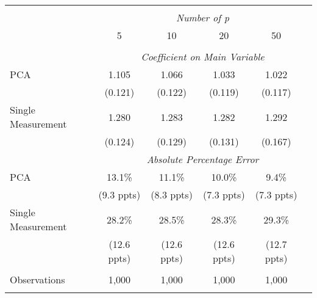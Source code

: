\begin{table}[!htbp] \centering
\begin{tabular}{@{\extracolsep{5pt}}lccccc}
\\[-1.8ex]\hline
\hline \\[-1.8ex]
& \multicolumn{5}{c}{\textit{Number of p}} \
\cr \cline{5-6}
\\[-1.8ex] & 5 & 10 & 20 & 50 \\
\hline \\[-1.8ex]
& \multicolumn{5}{c}{\textit{Coefficient on Main Variable}} \\
 PCA & 1.105 & 1.066 & 1.033 & 1.022  \\
  & (0.121) & (0.122) & (0.119) & (0.117)\\
  Single Measurement & 1.280 & 1.283 & 1.282 & 1.292  \\
  & (0.124) & (0.129) & (0.131) & (0.167)\\
& \multicolumn{5}{c}{\textit{Absolute Percentage Error}} \\
  PCA & 13.1\% & 11.1\% & 10.0\% & 9.4\%  \\
   & (9.3 ppts) & (8.3 ppts) & (7.3 ppts) & (7.3 ppts)\\
  Single Measurement & 28.2\% & 28.5\% & 28.3\% & 29.3\%  \\
  & (12.6 ppts) & (12.6 ppts) & (12.6 ppts) & (12.7 ppts)\\
\hline \\[-1.8ex]
 Observations & 1,000 & 1,000 & 1,000 & 1,000 & \\
\hline
\hline \\[-1.8ex]
\end{tabular}
\end{table}